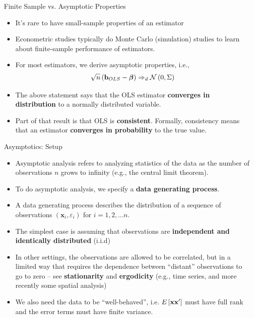 \documentclass[english,xcolor={dvipsnames},aspectratio=169]{beamer}
\begin{document}
\begin{frame}{Finite Sample vs. Asymptotic Properties}
\begin{itemize}
	\item It's rare to have small-sample properties of an estimator

	\medskip
	\item Econometric studies typically do Monte Carlo (simulation) studies to learn
	about finite-sample performance of estimators. 

	\medskip
	\item For most estimators, we derive asymptotic properties, i.e., \[
	\sqrt{n} \left({\bf b}_{OLS} - \boldsymbol{\beta}\right) \Rightarrow_{d} \mathcal{N}\left(0, \Sigma\right)
	\]

	\item The above statement says that the OLS estimator
	 {\bf converges in distribution} to a normally distributed variable.

	\item Part of that result is that OLS is {\bf consistent}. Formally, consistency means that an estimator
	{\bf converges in probability} to the true value. 
\end{itemize}
\end{frame}



\begin{frame}{Asymptotics: Setup}
\begin{itemize}

	\item Asymptotic analysis refers to analyzing statistics of the data as the number of observations $n$
	grows to infinity (e.g., the central limit theorem).

	\item To do asymptotic analysis, we specify a {\bf data generating process}. 
	
	\item A data generating process describes the distribution of 
	 a sequence of observations $\left(\boldsymbol{x}_{i},\varepsilon_{i}\right)$ 	for $i=1,2,\dots n$. 


	\item The simplest case is assuming that observations are {\bf independent and identically distributed}
	(i.i.d)

	\item In other settings, the observations are allowed to be correlated, but in a limited way 
	that requires the dependence between ``distant'' observations to go to zero -- see {\bf stationarity}
	and {\bf ergodicity} (e.g., time series, and 	more recently some spatial analysis)

	\item We also need the data to be ``well-behaved'', i.e. $E\left[{\bf x} {\bf x}' \right]$ must have
	full rank and the error terms must have finite variance. 

\end{itemize}
\end{frame}
\end{document}
